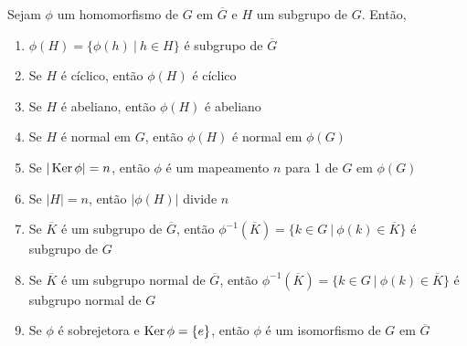	\begin{theorem}
	\label{homomorfismos em subgrupos}
		Sejam $\phi$ um homomorfismo de $G$ em $\overline{G}$ e $H$ um subgrupo de $G$. Então,
		\begin{enumerate}
			\item $\phi(H) = \{ \phi(h) \ | \ h\in H \}$ é subgrupo de $\overline{G}$
			\item Se $H$ é cíclico, então $\phi(H)$ é cíclico
			\item Se $H$ é abeliano, então $\phi(H)$ é abeliano
			\item Se $H$ é normal em $G$, então $\phi(H)$ é normal em $\phi(G)$
			\item Se $|\operatorname{Ker}\phi| = n$, então $\phi$ é um mapeamento $n$ para 1 de $G$ em $\phi (G)$
			\item Se $|H| = n$, então $|\phi(H)|$ divide $n$
			\item Se $\overline{K}$ é um subgrupo de $\overline{G}$, então 
			$\phi^{-1}(\overline{K}) = \{ k\in G \ | \ \phi(k)\in \overline{K} \}$ é subgrupo de $G$
			\item Se $\overline{K}$ é um subgrupo normal de $\overline{G}$, 
			então $\phi^{-1}(\overline{K}) = \{ k\in G \ | \ \phi(k)\in \overline{K} \}$ é subgrupo normal de $G$
			\item Se $\phi$ é sobrejetora e $\operatorname{Ker}\phi = \{e\}$, então $\phi$ é 
			um isomorfismo de $G$ em $\overline{G}$
		\end{enumerate}
	\end{theorem}
